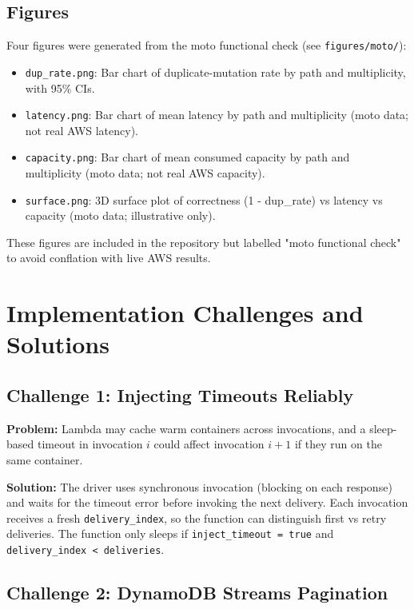 \subsection{Figures}

Four figures were generated from the moto functional check (see \texttt{figures/moto/}):

\begin{itemize}
    \item \texttt{dup\_rate.png}: Bar chart of duplicate-mutation rate by path and multiplicity, with 95\% CIs.
    \item \texttt{latency.png}: Bar chart of mean latency by path and multiplicity (moto data; not real AWS latency).
    \item \texttt{capacity.png}: Bar chart of mean consumed capacity by path and multiplicity (moto data; not real AWS capacity).
    \item \texttt{surface.png}: 3D surface plot of correctness (1 - dup\_rate) vs latency vs capacity (moto data; illustrative only).
\end{itemize}

These figures are included in the repository but labelled "moto functional check" to avoid conflation with live AWS results.

\section{Implementation Challenges and Solutions}

\subsection{Challenge 1: Injecting Timeouts Reliably}

\textbf{Problem:} Lambda may cache warm containers across invocations, and a sleep-based timeout in invocation $i$ could affect invocation $i+1$ if they run on the same container.

\textbf{Solution:} The driver uses synchronous invocation (blocking on each response) and waits for the timeout error before invoking the next delivery. Each invocation receives a fresh \texttt{delivery\_index}, so the function can distinguish first vs retry deliveries. The function only sleeps if \texttt{inject\_timeout = true} and \texttt{delivery\_index < deliveries}.

\subsection{Challenge 2: DynamoDB Streams Pagination}

